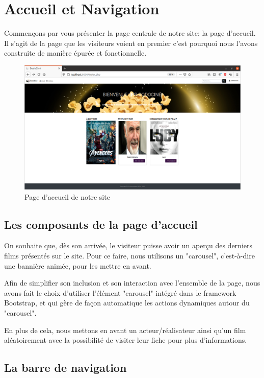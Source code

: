 \chapter{Accueil et Navigation}

    Commençons par vous présenter la page centrale de notre site: la page d'accueil. Il s'agit de la page que les visiteurs voient en premier c'est pourquoi nous l'avons construite de manière épurée et fonctionnelle. 

    \medskip
    \begin{figure}[!ht]
        \centering
        \includegraphics[width=15cm]{img/page_accueil.png}
        \caption{Page d'accueil de notre site}
    \end{figure}

    \section{Les composants de la page d'accueil}
        
        On souhaite que, dès son arrivée, le visiteur puisse avoir un aperçu des derniers films présentés sur le site. Pour ce faire, nous utilisons un "carousel", c'est-à-dire une bannière animée, pour les mettre en avant. 

        Afin de simplifier son inclusion et son interaction avec l'ensemble de la page, nous avons fait le choix d'utiliser l'élément "carousel" intégré dans le framework Bootstrap, et qui gère de façon automatique les actions dynamiques autour du "carousel".

        \medskip
        En plus de cela, nous mettons en avant un acteur/réalisateur ainsi qu'un film aléatoirement avec la possibilité de visiter leur fiche pour plus d'informations.


    \section{La barre de navigation}

